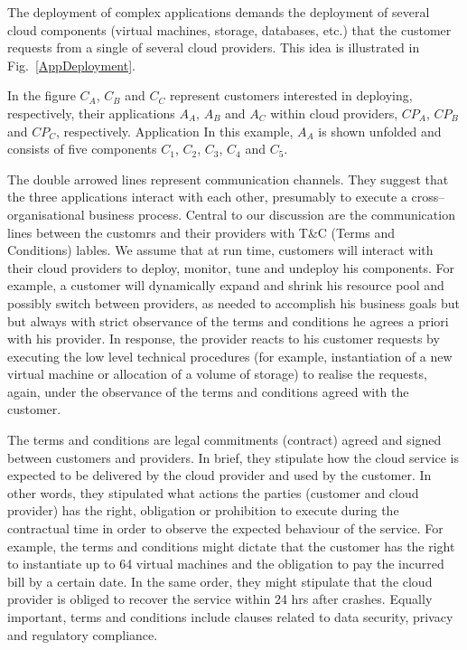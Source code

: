 \documentclass[runningheads,a4paper]{llncs}
\begin{document}
The deployment of complex applications demands the deployment of
several cloud components (virtual machines, storage, databases, etc.) that
the customer requests from a single of several cloud providers. This
idea is illustrated in Fig.~\ref{AppDeployment}.

In the figure $C_A$, $C_B$ and $C_C$ represent customers interested in
deploying, respectively, their applications $A_A$, $A_B$ and $A_C$ within
cloud providers, ${CP}_A$, ${CP}_B$ and ${CP}_C$, respectively. Application
In this example, $A_A$ is shown unfolded and consists of five components  
$C_1$, $C_2$, $C_3$, $C_4$ and $C_5$. 

The double arrowed lines represent communication channels. They 
suggest that the three applications interact with each other,
presumably to execute a cross--organisational business process.
Central to our discussion are the communication lines between
the customrs and their providers with T\&C (Terms and Conditions)
lables. We assume that at run time, customers will interact with
their cloud providers to deploy, monitor, tune and undeploy
his components. For example, a customer will dynamically expand 
and shrink his resource pool and possibly switch between 
providers, as needed to accomplish his business goals but 
but always with strict observance of the terms and conditions he 
agrees a priori with his provider. In response, the provider
reacts to his customer requests by executing the low level
technical procedures (for example, instantiation of a new
virtual machine or allocation of a volume of storage) to realise the 
requests, again, under the observance of the terms and conditions 
agreed with the customer.

The terms and conditions are legal commitments (contract) agreed
and signed between customers and providers. In brief, they
stipulate how the cloud service is expected to be delivered
by the cloud provider and used by the customer. In other words,
they stipulated what actions the parties (customer and cloud provider)
has the right, obligation or prohibition to execute during the
contractual time in order to observe the expected behaviour
of the service. For example, the terms and conditions might
dictate that the customer has the right to instantiate up
to 64 virtual machines and the obligation to pay the incurred
bill by a certain date. In the same order, they might stipulate
that the cloud provider is obliged to recover the service within
24 hrs after crashes. Equally important, terms and conditions
include clauses related to data security, privacy and 
regulatory compliance.  
\end{document}
